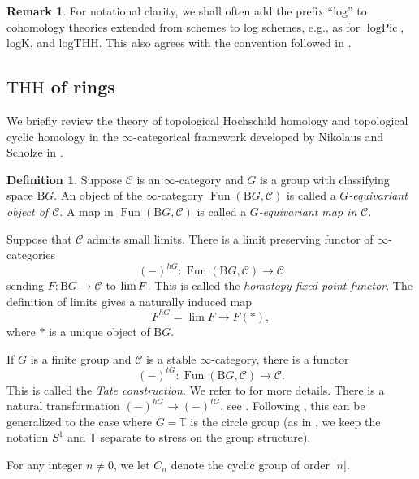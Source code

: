 \documentclass[11pt, a4paper]{amsart}
\theoremstyle{definition}
\newtheorem{df}[thm]{Definition}
\newtheorem{rmk}[thm]{Remark}
\numberwithin{equation}{subsection}
\renewcommand{\lim}{\operatorname{lim}}			 %
\newcommand{\limit}{\mathop{\rm lim}}
\newcommand{\THH}{\mathrm{THH}}
\newcommand{\clspace}{\mathrm{B}}
\newcommand{\logTHH}{\mathrm{logTHH}}
\newcommand{\Kthlog}{\mathrm{logK}}
\newcommand{\logPic}{\operatorname{logPic}}
\newcommand{\cC}{\mathcal{C}}
\newcommand{\Fun}{\operatorname{Fun}}
\newcommand{\infC}{\mathcal{C}}
\begin{document}
\begin{rmk}
For notational clarity, 
we shall often add the prefix ``$\mathrm{log}$'' to cohomology theories extended from schemes to log schemes, 
e.g., 
as for $\logPic$, $\Kthlog$, and $\logTHH$. This also agrees with the convention followed in \cite{BLPO2}. 
\end{rmk}

\subsection{\texorpdfstring{$\THH$}{THH} of rings}
\label{subsection:thhrings}

We briefly review the theory of topological Hochschild homology and topological cyclic homology in the 
$\infty$-categorical framework developed by Nikolaus and Scholze in \cite{NikolausScholze}.
\begin{df}
\label{Hoch.38}
Suppose $\infC$ is an $\infty$-category and $G$ is a group with classifying space $\clspace G$.
An object of the $\infty$-category $\Fun(\clspace G,\infC)$ is called a \emph{$G$-equivariant object of $\cC$}.
A map in $\Fun(\clspace G,\infC)$ is called a \emph{$G$-equivariant map in $\cC$}.

Suppose that $\cC$ admits small limits.
There is a limit preserving functor of $\infty$-categories
\[
(-)^{hG}
\colon
\Fun(\clspace G,\infC)\to \infC
\]
sending $F\colon \clspace G\to \infC$ to $\limit F$.
This is called the \emph{homotopy fixed point functor}.
The definition of limits gives a naturally induced map
\begin{equation}
\label{Hoch.38.1}
F^{hG}
=
\lim F
\to
F(*),
\end{equation}
where $*$ is a unique object of $\clspace G$.

If $G$ is a finite group  and $\infC$ is a stable $\infty$-category, there is a functor
\[
(-)^{tG}
\colon
\Fun(\clspace G,\infC)\to \infC.
\]
This is called the \emph{Tate construction}.
We refer to \cite[Definition I.1.13]{NikolausScholze} for more details.
There is a natural transformation $(-)^{hG}\to(-)^{tG}$,
see \cite[Theorem I.3.1]{NikolausScholze}. Following \cite[1.4]{NikolausScholze}, this can be generalized to the case where $G=\mathbb{T}$ is the circle group (as in \cite{NikolausScholze}, we keep the notation $S^1$ and $\mathbb{T}$ separate to stress on the group structure). 
\end{df}

For any integer $n\neq 0$, 
we let $C_n$ denote the cyclic group of order $\lvert n \rvert$.
\end{document}
